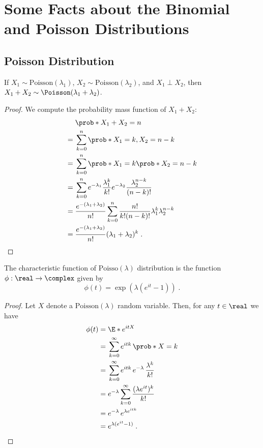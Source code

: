 \chapter{Some Facts about the Binomial and Poisson Distributions}

\section{Poisson Distribution}

\begin{fact}\label{Fact:poissonsum}
If $X_1\sim\mathrm{Poisson}(\lambda_1)$,
$X_2\sim\mathrm{Poisson}(\lambda_2)$,
and $X_1\perp X_2$, then 
$X_1+X_2\sim\Poisson(\lambda_1+\lambda_2)$.
\end{fact}

\begin{proof}
We compute the probability mass function of $X_1+X_2$:
\begin{align*}
   & \prob*{X_1+X_2=n}\\    
={}& \sum_{k=0}^n \prob*{X_1=k,X_2=n-k}\\
={}& \sum_{k=0}^n \prob*{X_1=k}\prob*{X_2=n-k}\\
={}& \sum_{k=0}^n e^{-\lambda_1}\frac{\lambda_1^k}{k!}
e^{-\lambda_2}\frac{\lambda_2^{n-k}}{(n-k)!}\\
={}& 
\frac{e^{-(\lambda_1+\lambda_2)}}{n!}
\sum_{k=0}^n \frac{n!}{k!(n-k)!}\lambda_1^k\lambda_2^{n-k}\\
={}&\frac{e^{-(\lambda_1+\lambda_2)}}{n!}
(\lambda_1+\lambda_2)^k\;.
\end{align*}
\end{proof}

\begin{fact}
The characteristic function of $\mathrm{Poisso}(\lambda)$ distribution is the function $\phi:\real\to\complex$ given by 
\[
\phi(t) = \exp\left(\lambda(e^{it}-1)\right) \;.
\]
\end{fact}

\begin{proof}
Let $X$ denote a $\mathrm{Poisson}(\lambda)$ random variable. Then, for any $t\in\real$ we have
\begin{align*}
\phi(t) ={} & \E*{e^{itX}}\\
={} & \sum_{k=0}^\infty e^{itk} \, \prob*{X=k}\\
={} & \sum_{k=0}^\infty e^{itk} \, e^{-\lambda} \, \frac{\lambda^k}{k!}\\
={} & e^{-\lambda} \sum_{k=0}^\infty \frac{(\lambda e^{it})^k}{k!}\\
={} & e^{-\lambda} \, e^{\lambda e^{itk}}\\
={} & e^{\lambda (e^{it}-1)}\;.
\end{align*}
\end{proof}

